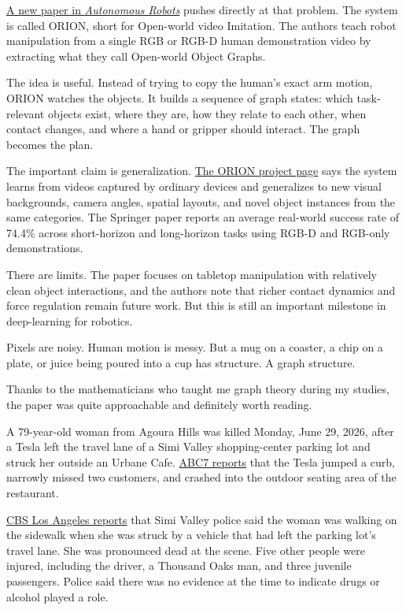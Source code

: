 \documentclass{news}
\begin{document}
\href{https://link.springer.com/article/10.1007/s10514-026-10253-8}{A new paper in \textit{Autonomous Robots}} pushes directly at that problem. The system is called ORION, short for Open-world video Imitation. The authors teach robot manipulation from a single RGB or RGB-D human demonstration video by extracting what they call Open-world Object Graphs.

The idea is useful. Instead of trying to copy the human's exact arm motion, ORION watches the objects. It builds a sequence of graph states: which task-relevant objects exist, where they are, how they relate to each other, when contact changes, and where a hand or gripper should interact. The graph becomes the plan.

The important claim is generalization. \href{https://ut-austin-rpl.github.io/ORION-release/}{The ORION project page} says the system learns from videos captured by ordinary devices and generalizes to new visual backgrounds, camera angles, spatial layouts, and novel object instances from the same categories. The Springer paper reports an average real-world success rate of 74.4\% across short-horizon and long-horizon tasks using RGB-D and RGB-only demonstrations.

There are limits. The paper focuses on tabletop manipulation with relatively clean object interactions, and the authors note that richer contact dynamics and force regulation remain future work. But this is still an important milestone in deep-learning for robotics.

Pixels are noisy. Human motion is messy. But a mug on a coaster, a chip on a plate, or juice being poured into a cup has structure. A graph structure. 

Thanks to the mathematicians who taught me graph theory during my studies, the paper was quite approachable and definitely worth reading.
{A 79-year-old woman from Agoura Hills was killed Monday, June 29, 2026, after a Tesla left the travel lane of a Simi Valley shopping-center parking lot and struck her outside an Urbane Cafe. \href{https://abc7.com/post/simi-valley-crash-1-killed-5-injured-car-slams-urbane-cafe-restaurant/19416545/}{ABC7 reports} that the Tesla jumped a curb, narrowly missed two customers, and crashed into the outdoor seating area of the restaurant.
\par}

\href{https://www.cbsnews.com/losangeles/news/simi-valley-target-parking-lot-urbane-cafe-deadly-crash-tierra-rejada-road/}{CBS Los Angeles reports} that Simi Valley police said the woman was walking on the sidewalk when she was struck by a vehicle that had left the parking lot's travel lane. She was pronounced dead at the scene. Five other people were injured, including the driver, a Thousand Oaks man, and three juvenile passengers. Police said there was no evidence at the time to indicate drugs or alcohol played a role.
\end{document}
